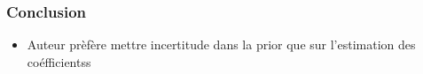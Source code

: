 \documentclass{presentation_template}
\begin{document}
\begin{frame}
    \normalsize
    \frametitle{Conclusion}

    \begin{itemize}
        \item Auteur prèfère mettre incertitude dans la prior que sur l'estimation des coéfficientss
    \end{itemize}
\end{frame}

\breakingframe{
\begin{textblock*}{13cm}(3.5cm,4cm)
    
\Huge\textbf{\textcolor{black}{Merci de votre attention}}
\end{textblock*}
}




\end{document}
